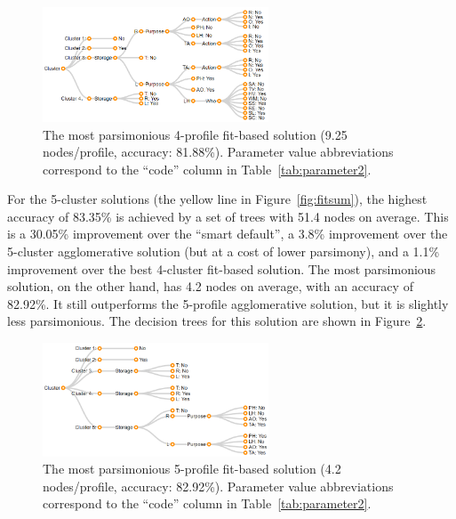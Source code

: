 \begin{figure}
	\centering
	\includegraphics[width=0.6\textwidth]{figures/fit_4_profile010.png}
	\caption{The most parsimonious 4-profile fit-based solution (9.25 nodes/profile, accuracy: 81.88\%). Parameter value abbreviations correspond to the ``code'' column in Table~\ref{tab:parameter2}.}
	\label{fig:fit_4_profile010}
	\vspace{20px}
\end{figure}

For the 5-cluster solutions (the yellow line in Figure~\ref{fig:fitsum}), the highest accuracy of 83.35\% is achieved by a set of trees with 51.4 nodes on average. This is a 30.05\% improvement over the ``smart default'', a 3.8\% improvement over the 5-cluster agglomerative solution (but at a cost of lower parsimony), and a 1.1\% improvement over the best 4-cluster fit-based solution. The most parsimonious solution, on the other hand, has 4.2 nodes on average, with an accuracy of 82.92\%. It still outperforms the 5-profile agglomerative solution, but it is slightly less parsimonious. The decision trees for this solution are shown in Figure~\ref{fig:fit_5_profile001}.

\begin{figure}
	\centering
	\includegraphics[width=0.6\textwidth]{figures/fit_5_profile001.png}
	\caption{The most parsimonious 5-profile fit-based solution (4.2 nodes/profile, accuracy: 82.92\%). Parameter value abbreviations correspond to the ``code'' column in Table~\ref{tab:parameter2}.}
	\label{fig:fit_5_profile001}
\end{figure}


